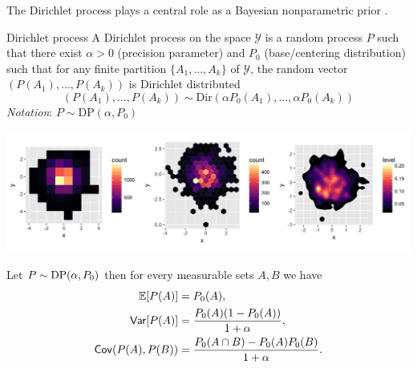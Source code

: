 The Dirichlet process plays a central role as a Bayesian nonparametric prior \citep{ferguson1973bayesian}.

\begin{definition}{Dirichlet process}
A \alert{Dirichlet process} on the space $\mathcal{Y}$ is a random process $ P $ such that there exist $ \alpha>0 $ (precision parameter) and $ P_0 $ (base/centering distribution)  such that for any finite partition $ \{A_1,\ldots,A_k\} $ of $\mathcal{Y}$, the random vector
$ (P(A_1),\ldots,P(A_k)) $ is Dirichlet distributed
\[ (P(A_1),\ldots,P(A_k))\sim \text{Dir}(\alpha P_0(A_1),\ldots,\alpha P_0(A_k)) \]
\textit{Notation}: $ P \sim \text{DP}(\alpha, P_0) $
\end{definition}
\begin{center}
\includegraphics[width=\textwidth]{figures_julyan/intro_DP/DP_marginal}
\end{center}


\begin{proposition}
Let $P\sim \text{DP}(\alpha, P_0)$ then for every measurable sets $A, B$ we have
\begin{align*}
    \mathbb{E}[ P(A)] &= P_0(A),\\
    \mathsf{Var}[P(A)] &= \frac{P_0(A)(1-P_0(A))}{1+\alpha},\\
    \mathsf{Cov}( P(A), P(B) )&=\frac{P_0(A \cap B) - P_0(A)P_0(B) }{1+\alpha}\label{Dir:Covariance}.
\end{align*}
\end{proposition}


